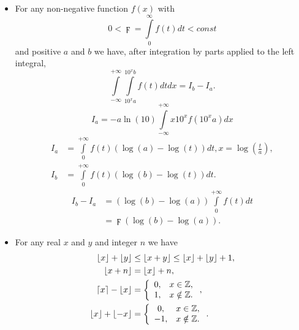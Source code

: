 \documentclass[titlepage,fleqn]{article}%
\providecommand{\U}[1]{\protect\rule{.1in}{.1in}}
\begin{document}
\begin{itemize}
\item For any non-negative function $f(x)$ with \
\[
0<\digamma=%
{\displaystyle\int\limits_{0}^{\infty}}
f(t)dt<const
\]
and positive $a$ and $b$ we have, after integration by parts applied to the
left integral,
\[%
{\displaystyle\int\limits_{-\infty}^{+\infty}}
{\displaystyle\int\limits_{10^{x}a}^{10^{x}b}}
f(t)dtdx=I_{b}-I_{a}.
\]%
\[
I_{a}=-a\ln(10)%
{\displaystyle\int\limits_{-\infty}^{+\infty}}
x10^{x}f(10^{x}a)dx
\]%
\begin{align*}
I_{a}  &  =%
{\displaystyle\int\limits_{0}^{+\infty}}
f(t)(\log(a)-\log(t))dt,x=\log\left(  \frac{t}{a}\right)  ,\\
I_{b}  &  =%
{\displaystyle\int\limits_{0}^{+\infty}}
f(t)(\log(b)-\log(t))dt.
\end{align*}%
\begin{align*}
I_{b}-I_{a}  &  =(\log(b)-\log(a))%
{\displaystyle\int\limits_{0}^{+\infty}}
f(t)dt\\
&  =\digamma(\log(b)-\log(a)).
\end{align*}


\item For any real $x$ and $y$ and integer $n$ we have%
\begin{align}
\lfloor x\rfloor+\lfloor y\rfloor &  \leq\lfloor x+y\rfloor\leq\lfloor
x\rfloor+\lfloor y\rfloor+1,\label{Prop2}\\
\lfloor x+n\rfloor &  =\lfloor x\rfloor+n,\nonumber\\
\lceil x\rceil-\lfloor x\rfloor &  =\left\{
\begin{array}
[c]{cc}%
0, & x\in%
\mathbb{Z}
,\\
1, & x\notin%
\mathbb{Z}
.
\end{array}
\right.  ,\\
\lfloor x\rfloor+\lfloor-x\rfloor &  =\left\{
\begin{array}
[c]{cc}%
0, & x\in%
\mathbb{Z}
,\\
-1, & x\notin%
\mathbb{Z}
.
\end{array}
\right.  .
\end{align}

\end{itemize}
\end{document}
